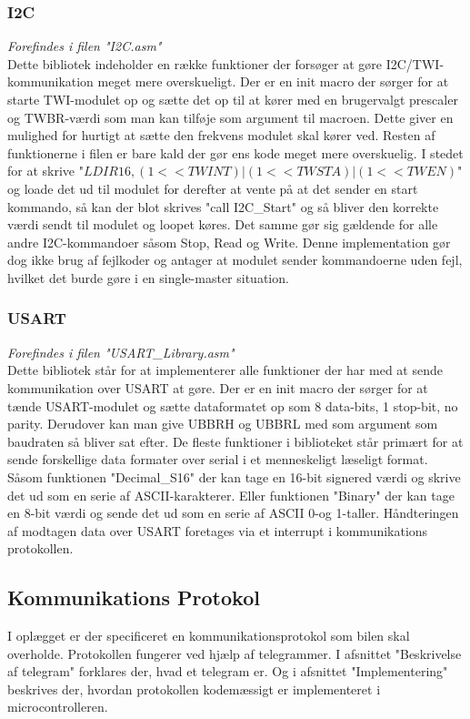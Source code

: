 \subsubsection{I2C}
\textit{Forefindes i filen "I2C.asm"}\\
Dette bibliotek indeholder en række funktioner der forsøger at gøre I2C/TWI- kommunikation meget mere overskueligt. Der er en init macro der sørger for at starte TWI-modulet op og sætte det op til at kører med en brugervalgt prescaler og TWBR-værdi som man kan tilføje som argument til macroen. Dette giver en mulighed for hurtigt at sætte den frekvens modulet skal kører ved. Resten af funktionerne i filen er bare kald der gør ens kode meget mere overskuelig. I stedet for at skrive "$LDI R16,(1<<TWINT)|(1<<TWSTA)|(1<<TWEN)$" og loade det ud til modulet for derefter at vente på at det sender en start kommando, så kan der blot skrives "call I2C\_Start" og så bliver den korrekte værdi sendt til modulet og loopet køres. Det samme gør sig gældende for alle andre I2C-kommandoer såsom Stop, Read og Write. Denne implementation gør dog ikke brug af fejlkoder og antager at modulet sender kommandoerne uden fejl, hvilket det burde gøre i en single-master situation.

\subsubsection{USART}
\textit{Forefindes i filen "USART\_Library.asm"}\\
Dette bibliotek står for at implementerer alle funktioner der har med at sende kommunikation over USART at gøre. Der er en init macro der sørger for at tænde USART-modulet og sætte dataformatet op som 8 data-bits, 1 stop-bit, no parity. Derudover kan man give UBBRH og UBBRL med som argument som baudraten så bliver sat efter. De fleste funktioner i biblioteket står primært for at sende forskellige data formater over serial i et menneskeligt læseligt format. Såsom funktionen "Decimal\_S16" der kan tage en 16-bit signered værdi og skrive det ud som en serie af ASCII-karakterer. Eller funktionen "Binary" der kan tage en 8-bit værdi og sende det ud som en serie af ASCII 0-og 1-taller. Håndteringen af modtagen data over USART foretages via et interrupt i kommunikations protokollen.

\subsection{Kommunikations Protokol}
I oplægget er der specificeret en kommunikationsprotokol som bilen skal overholde. Protokollen fungerer ved hjælp af telegrammer. I afsnittet "Beskrivelse af telegram" forklares der, hvad et telegram er. Og i afsnittet "Implementering" beskrives der, hvordan protokollen kodemæssigt er implementeret i microcontrolleren.

